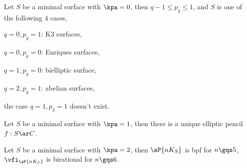 \documentclass[a4paper, twoside]{article}
\begin{document}
\begin{thm}
	Let $S$ be a minimal surface with $\kpa=0$, then $q-1\leq p_{g}\leq1$, and $S$ is one of the following $4$ cases,
	\begin{enr}
		\item $q=0, p_{g}=1$: K3 surfaces,
		\item $q=0, p_{g}=0$: Enriques surfaces,
		\item $q=1, p_{g}=0$: bielliptic surface,
		\item $q=2, p_{g}=1$: abelian surfaces,
	\end{enr}
	the case $q=1,p_{g}=1$ doesn't exist.
\end{thm}

\begin{thm}
	Let $S$ be a minimal surface with $\kpa=1$, then there is a unique elliptic pencil $f:S\ar C$.
\end{thm}


\begin{thm}
	Let $S$ be a minimal surface with $\kpa=2$, then $\sP{nK_{S}}$ is bpf for $n\gqs5$, $\vfi_{\sP{nK_{S}}}$ is birational for $n\gqs6$.
\end{thm}


\end{document}
